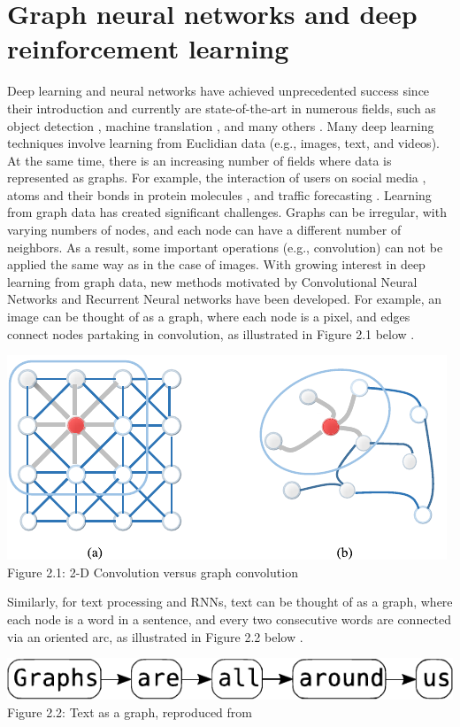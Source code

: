 \chapter{Graph neural networks and deep reinforcement learning}
\label{chap:math}

Deep learning and neural networks have achieved unprecedented success since their introduction and currently are state-of-the-art in numerous fields, such as object detection \cite{DBLP:journals/corr/RedmonDGF15, 10.1109/IVS.2019.8813777, 8627998}, machine translation \cite{DBLP:journals/corr/LuongPM15, 8003957, DBLP:journals/corr/abs-2002-07526}, and many others \cite{DONG2021100379, 10.1145/3505243, PICCIALLI2021111}. Many deep learning techniques involve learning from Euclidian data (e.g., images, text, and videos). At the same time, there is an increasing number of fields where data is represented as graphs. For example, the interaction of users on social media \cite{10.1145/3308558.3313488}, atoms and their bonds in protein molecules \cite{strokach2020fast}, and traffic forecasting \cite{JIANG2022117921}. Learning from graph data has created significant challenges. Graphs can be irregular, with varying numbers of nodes, and each node can have a different number of neighbors. As a result, some important operations (e.g., convolution) can not be applied the same way as in the case of images. With growing interest in deep learning from graph data, new methods motivated by Convolutional Neural Networks and Recurrent Neural networks have been developed. For example, an image can be thought of as a graph, where each node is a pixel, and edges connect nodes partaking in convolution, as illustrated in Figure 2.1 below \cite{9046288}.\\
\begin{center}
    \includegraphics[width=0.6\linewidth]{images/image_vs_graph.pdf}\\
    Figure 2.1: 2-D Convolution versus graph convolution \cite{9046288}
\end{center}
\newpage
Similarly, for text processing and RNNs, text can be thought of as a graph, where each node is a word in a sentence, and every two consecutive words are connected via an oriented arc, as illustrated in Figure 2.2 below \cite{sanchez-lengeling2021a}.
\begin{center}
    \includegraphics[width=0.7\linewidth]{images/graph_are_all_around_us.pdf}\\
    Figure 2.2: Text as a graph, reproduced from \cite{sanchez-lengeling2021a}
\end{center}

